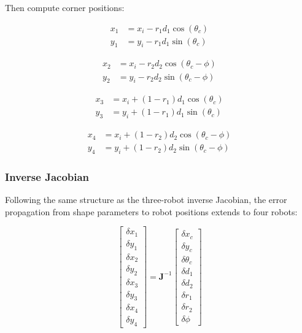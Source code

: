 \documentclass[lettersize,journal]{IEEEtran}
\begin{document}
Then compute corner positions:

\begin{equation}
\begin{aligned}
x_1 &= x_i - r_1 d_1 \cos(\theta_c) \\
y_1 &= y_i - r_1 d_1 \sin(\theta_c)
\end{aligned}
\end{equation}

\begin{equation}
\begin{aligned}
x_2 &= x_i - r_2 d_2 \cos(\theta_c - \phi) \\
y_2 &= y_i - r_2 d_2 \sin(\theta_c - \phi)
\end{aligned}
\end{equation}

\begin{equation}
\begin{aligned}
x_3 &= x_i + (1 - r_1) d_1 \cos(\theta_c) \\
y_3 &= y_i + (1 - r_1) d_1 \sin(\theta_c)
\end{aligned}
\end{equation}

\begin{equation}
\begin{aligned}
x_4 &= x_i + (1 - r_2) d_2 \cos(\theta_c - \phi) \\
y_4 &= y_i + (1 - r_2) d_2 \sin(\theta_c - \phi)
\end{aligned}
\end{equation}

\subsubsection{Inverse Jacobian}

Following the same structure as the three-robot inverse Jacobian, the error propagation from shape parameters to robot positions extends to four robots:

\begin{equation}
\begin{bmatrix}
\delta x_1 \\ \delta y_1 \\ \delta x_2 \\ \delta y_2 \\ \delta x_3 \\ \delta y_3 \\ \delta x_4 \\ \delta y_4
\end{bmatrix} =
\mathbf{J}^{-1}
\begin{bmatrix}
\delta x_c \\ \delta y_c \\ \delta \theta_c \\ \delta d_1 \\ \delta d_2 \\ \delta r_1 \\ \delta r_2 \\ \delta \phi
\end{bmatrix}
\end{equation}
\end{document}
